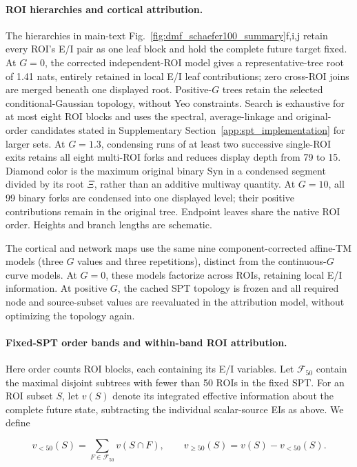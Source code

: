 \documentclass[fleqn,10pt]{wlscirep}
\begin{document}
\paragraph{ROI hierarchies and cortical attribution.}
The hierarchies in main-text Fig.~\ref{fig:dmf_schaefer100_summary}f,i,j retain every ROI's E/I pair as one leaf block and hold the complete future target fixed. At $G=0$, the corrected independent-ROI model gives a representative-tree root of 1.41 nats, entirely retained in local E/I leaf contributions; zero cross-ROI joins are merged beneath one displayed root. Positive-$G$ trees retain the selected conditional-Gaussian topology, without Yeo constraints. Search is exhaustive for at most eight ROI blocks and uses the spectral, average-linkage and original-order candidates stated in Supplementary Section~\ref{app:spt_implementation} for larger sets. At $G=1.3$, condensing runs of at least two successive single-ROI exits retains all eight multi-ROI forks and reduces display depth from 79 to 15. Diamond color is the maximum original binary Syn in a condensed segment divided by its root $\Xi$, rather than an additive multiway quantity. At $G=10$, all 99 binary forks are condensed into one displayed level; their positive contributions remain in the original tree. Endpoint leaves share the native ROI order. Heights and branch lengths are schematic.

The cortical and network maps use the same nine component-corrected affine-TM models (three $G$ values and three repetitions), distinct from the continuous-$G$ curve models. At $G=0$, these models factorize across ROIs, retaining local E/I information. At positive $G$, the cached SPT topology is frozen and all required node and source-subset values are reevaluated in the attribution model, without optimizing the topology again.

\paragraph{Fixed-SPT order bands and within-band ROI attribution.}
\label{app:dmf_order_bands}
Here order counts ROI blocks, each containing its E/I variables. Let $\mathcal F_{50}$ contain the maximal disjoint subtrees with fewer than 50 ROIs in the fixed SPT. For an ROI subset $S$, let $v(S)$ denote its integrated effective information about the complete future state, subtracting the individual scalar-source EIs as above. We define

\[
v_{<50}(S)=\sum_{F\in\mathcal F_{50}}v(S\cap F),\qquad
v_{\geq50}(S)=v(S)-v_{<50}(S).
\]
\end{document}
